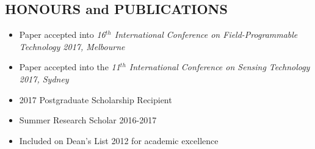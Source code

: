 \documentclass[3pt]{res}
\begin{document}
\begin{resume}
\section{HONOURS and PUBLICATIONS}
\begin{itemize}[noitemsep]
  \item Paper accepted into \textit{16$^{th}$ International Conference on Field-Programmable Technology 2017, Melbourne}
  \item Paper accepted into the \textit{11$^{th}$ International Conference on Sensing Technology 2017, Sydney}
  \item 2017 Postgraduate Scholarship Recipient
  \item Summer Research Scholar 2016-2017
  \item Included on Dean's List 2012 for academic excellence
  \end{itemize}

\end{resume}
\end{document}

